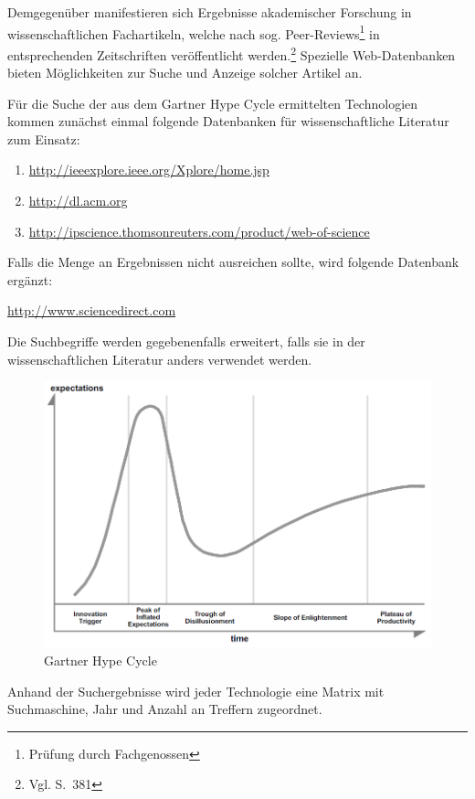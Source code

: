 Demgegenüber manifestieren sich Ergebnisse akademischer Forschung in wissenschaftlichen Fachartikeln, welche nach sog. \glqq Peer-Reviews\grqq \footnote{Prüfung durch Fachgenossen} in entsprechenden Zeitschriften veröffentlicht werden.\footnote{Vgl.  S.~381} Spezielle Web-Datenbanken bieten Möglichkeiten zur Suche und Anzeige solcher Artikel an.

Für die Suche der aus dem \glqq Gartner Hype Cycle \grqq ermittelten Technologien kommen zunächst einmal folgende Datenbanken für wissenschaftliche Literatur zum Einsatz:
\begin{enumerate}
	\item \url{http://ieeexplore.ieee.org/Xplore/home.jsp}
	\item \url{http://dl.acm.org}
	\item \url{http://ipscience.thomsonreuters.com/product/web-of-science}
\end{enumerate}

Falls die Menge an Ergebnissen nicht ausreichen sollte, wird folgende Datenbank ergänzt:

\url{http://www.sciencedirect.com}

Die Suchbegriffe werden gegebenenfalls erweitert, falls sie in der wissenschaftlichen Literatur anders verwendet werden.

\begin{figure}[h]
	\centering
	\includegraphics[width=0.9\linewidth]{img/ghc_raw}
	\caption{Gartner Hype Cycle}%
	\label{fig:ghc_raw}
\end{figure}

Anhand der Suchergebnisse wird jeder Technologie eine Matrix mit Suchmaschine, Jahr und Anzahl an Treffern zugeordnet. 

